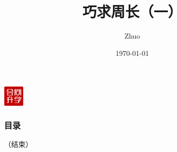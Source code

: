 \documentclass{beamer}
\title[巧求周长（一）]{巧求周长（一）}
\author{Zhuo}
\institute[] %
{
}
\date{\today} %
\begin{document}
	\begin{frame}
		\vspace{-1cm}
		\begin{flushleft}
			\includegraphics[width=1cm]{./pics/huixin_logo.png}
		\end{flushleft}
		\titlepage
	\end{frame}

	\begin{frame}
		\frametitle{目录}
		\tableofcontents %
	\end{frame}
	
	
	
		
	\begin{frame}
		\Huge{\centerline{（结束）}}
	\end{frame}
	
	
	
		
		
\end{document}
